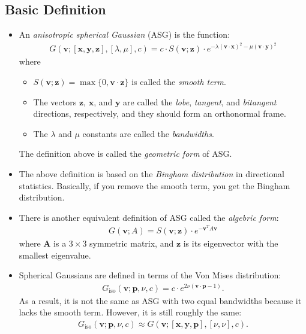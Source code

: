 \documentclass[10pt]{article}
\newcommand{\ve}[1]{\mathbf{#1}}
\begin{document}
  \subsection{Basic Definition}
  \begin{itemize}
    \item An \emph{anisotropic spherical Gaussian} (ASG) is the function:
    \begin{align*}
      G(\ve{v}; [\ve{x}, \ve{y}, \ve{z}], [\lambda,\mu], c) = c \cdot S(\ve{v};\ve{z}) \cdot e^{-\lambda(\ve{v} \cdot \ve{x})^2 -\mu(\ve{v} \cdot \ve{y})^2}
    \end{align*}
    where
    \begin{itemize}
      \item $S(\ve{v}; \ve{z}) = \max\{ 0, \ve{v} \cdot \ve{z} \}$ is called the \emph{smooth term}.
      \item The vectors $\ve{z}$, $\ve{x}$, and $\ve{y}$ are called the \emph{lobe}, \emph{tangent}, and \emph{bitangent} directions, respectively, and they should form an orthonormal frame.
      \item The $\lambda$ and $\mu$ constants are called the \emph{bandwidths}.
    \end{itemize}
    The definition above is called the \emph{geometric form} of ASG.

    \item The above definition is based on the \emph{Bingham distribution} in directional statistics.  Basically, if you remove the smooth term, you get the Bingham distribution.

    \item There is another equivalent definition of ASG called the \emph{algebric form}:
    \begin{align*}
      G(\ve{v}; A) = S(\ve{v}; \ve{z}) \cdot e^{-\ve{v}^T A \ve{v}}
    \end{align*}
    where $\ve{A}$ is a $3 \times 3$ symmetric matrix, and $\ve{z}$ is its eigenvector with the smallest eigenvalue.

    \item Spherical Gaussians are defined in terms of the Von Mises distribution:
    \begin{align*}
      G_{\mathrm{iso}}(\ve{v}; \ve{p}, \nu, c) = c \cdot e^{2\nu(\ve{v}\cdot\ve{p}-1)}.
    \end{align*}
    As a result, it is not the same as ASG with two equal bandwidths because it lacks the smooth term.  However, it is still roughly the same:
    \begin{align*}
      G_{\mathrm{iso}}(\ve{v};\ve{p},\nu, c) \approx G(\ve{v}; [\ve{x},\ve{y},\ve{p}], [\nu,\nu], c).
    \end{align*}
  \end{itemize}
\end{document}
